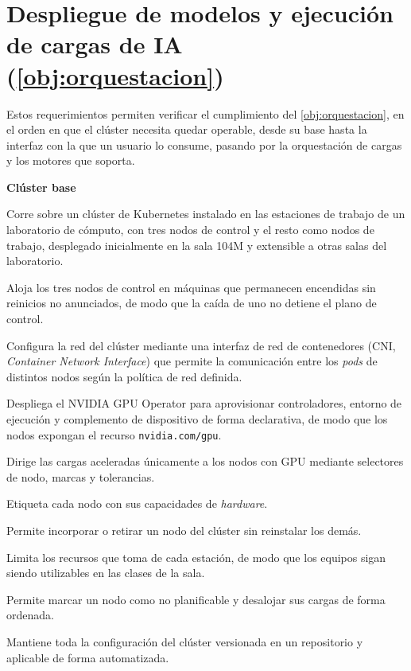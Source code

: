 \section[Despliegue de modelos y ejecución de cargas de IA (Objetivo 3)]{Despliegue de modelos y ejecución de cargas de IA (\cref{obj:orquestacion})}
\label{sec:req-orquestacion}

Estos requerimientos permiten verificar el cumplimiento del \cref{obj:orquestacion}, en el orden en que el clúster necesita quedar operable, desde su base hasta la interfaz con la que un usuario lo consume, pasando por la orquestación de cargas y los motores que soporta.

\noindent\textbf{Clúster base}
\begin{description}
\setlength{\itemsep}{4pt}
  \item[R3-01] Corre sobre un clúster de Kubernetes instalado en las estaciones de trabajo de un laboratorio de cómputo, con tres nodos de control y el resto como nodos de trabajo, desplegado inicialmente en la sala 104M y extensible a otras salas del laboratorio.
  \item[R3-02] Aloja los tres nodos de control en máquinas que permanecen encendidas sin reinicios no anunciados, de modo que la caída de uno no detiene el plano de control.
  \item[R3-03] Configura la red del clúster mediante una interfaz de red de contenedores (CNI, \emph{Container Network Interface}) que permite la comunicación entre los \emph{pods} de distintos nodos según la política de red definida.
  \item[R3-04] Despliega el NVIDIA GPU Operator para aprovisionar controladores, entorno de ejecución y complemento de dispositivo de forma declarativa, de modo que los nodos expongan el recurso \texttt{nvidia.com/gpu}.
  \item[R3-05] Dirige las cargas aceleradas únicamente a los nodos con GPU mediante selectores de nodo, marcas y tolerancias.
  \item[R3-06] Etiqueta cada nodo con sus capacidades de \emph{hardware}.
  \item[R3-07] Permite incorporar o retirar un nodo del clúster sin reinstalar los demás.
  \item[R3-08] Limita los recursos que toma de cada estación, de modo que los equipos sigan siendo utilizables en las clases de la sala.
  \item[R3-09] Permite marcar un nodo como no planificable y desalojar sus cargas de forma ordenada.
  \item[R3-10] Mantiene toda la configuración del clúster versionada en un repositorio y aplicable de forma automatizada.

\end{description}
